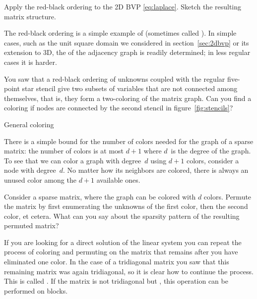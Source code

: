 \begin{exercise}
  Apply the red-black ordering to the 2D \ac{BVP} \eqref{eq:laplace}.
  Sketch the resulting matrix structure.
\end{exercise}

The red-black ordering is a simple
example of  (sometimes called
). In
simple cases, such as the unit square domain we considered in
section~\ref{sec:2dbvp} or its extension to 3D,
the  of the adjacency graph is readily determined;
in less regular cases it is harder.

\begin{exercise}
  You saw that a red-black ordering of unknowns
  coupled with the regular five-point star stencil give two subsets of
  variables that are not connected among themselves, that is, 
  they form a two-coloring of the matrix graph. 
  Can you find a coloring if nodes are connected by the second stencil in
  figure~\ref{fig:stencils}?
\end{exercise}


 {General coloring}

There is a simple bound for the number of colors needed for the graph
of a sparse matrix: the number of colors is at most $d+1$ where
$d$~is the degree of the graph. To see that we can color a graph with
degree~$d$ using $d+1$ colors, consider a node with
degree~$d$. No matter how its neighbors are colored, there is always
an unused color among the $d+1$ available ones.

\begin{exercise}
  Consider a sparse matrix, where the graph can be colored with $d$
  colors. Permute the matrix by first enumerating the unknowns of the
  first color,
  then the second color, et cetera. What can you say about the
  sparsity pattern of the resulting permuted matrix?
\end{exercise}

If you
are looking for a direct solution of the linear system you can repeat
the process of coloring and permuting on the matrix that remains
after you have eliminated one color. In the case of a tridiagonal
matrix you saw that this remaining matrix was again tridiagonal, so
it is clear how to continue the process. This is called
. If the matrix is not tridiagonal but
, this operation can be performed on
blocks.

